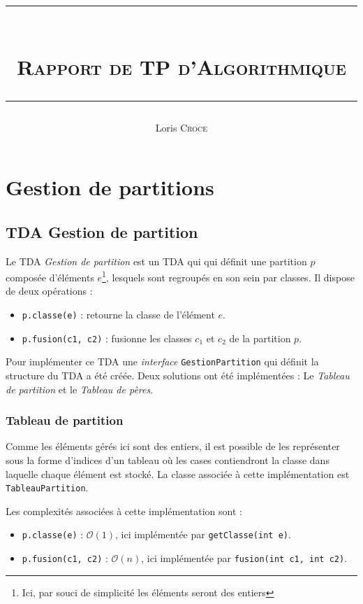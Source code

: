 \documentclass[12pt, a4paper]{report}
\author{Loris \textsc{Croce}}
\title{\rule{\textwidth}{1pt} \\ \Huge\textsc{Rapport de TP d'Algorithmique} \\ \rule{\textwidth}{1pt}}
\begin{document}
\maketitle{}

\tableofcontents


\chapter{Gestion de partitions}

    \section{TDA Gestion de partition}

    Le TDA \emph{Gestion de partition} est un TDA qui qui définit une partition $p$ composée d'éléments $e$\footnote{Ici, par souci de simplicité les éléments seront des entiers}, lesquels sont regroupés en son sein par classes. Il dispose de deux opérations :
    \begin{itemize}
        \item \texttt{p.classe(e)} : retourne la classe de l'élément $e$.
        \item \texttt{p.fusion(c1, c2)} : fusionne les classes $c_1$ et $c_2$ de la partition $p$.
    \end{itemize}


    Pour implémenter ce TDA une \emph{interface} \texttt{GestionPartition} qui définit la structure du TDA a été créée. Deux solutions ont été implémentées : Le \emph{Tableau de partition} et le \emph{Tableau de pères}.

    \subsection{Tableau de partition}

    Comme les éléments gérés ici sont des entiers, il est possible de les représenter sous la forme d'indices d'un tableau où les cases contiendront la classe dans laquelle chaque élément est stocké. La classe associée à cette implémentation est \texttt{TableauPartition}.

    Les complexités associées à cette implémentation sont :
    \begin{itemize}
        \item \texttt{p.classe(e)} : $\mathcal{O}(1)$, ici implémentée par \texttt{getClasse(int e)}.
        \item \texttt{p.fusion(c1, c2)} : $\mathcal{O}(n)$, ici implémentée par \texttt{fusion(int c1, int c2)}.
    \end{itemize}
\end{document}
